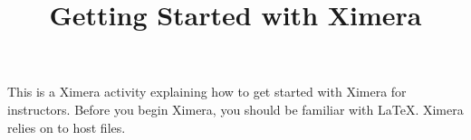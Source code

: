 \documentclass{ximera}
\title{Getting Started with Ximera}
\begin{document}
\maketitle

This is a Ximera activity explaining how to get started with Ximera for instructors. 
Before you begin Ximera, you should be familiar with \LaTeX.
Ximera relies on  to host files.
\end{document}
